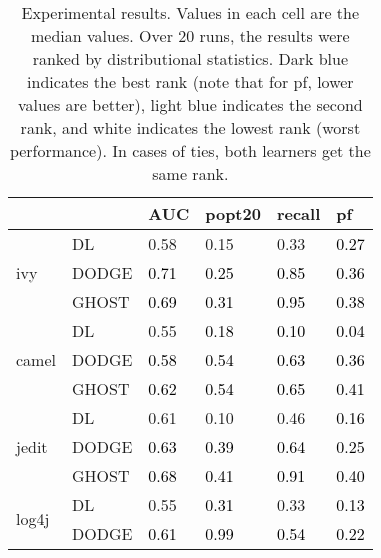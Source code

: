 \newcommand{\lightgray}[1]{\cellcolor{blue!10}\textcolor{black}{#1}}
\newcommand{\gray}[1]{\cellcolor{blue!30}\textcolor{black}{#1}}

\begin{table}[ht]
\caption{Experimental results. Values in each cell are the median values. Over 20 runs, the results were ranked by distributional statistics. \colorbox{blue!30}{Dark blue} indicates the best rank (note that for pf, lower values are better), \colorbox{blue!10}{light blue} indicates the second rank, and white indicates the lowest rank (worst performance). In cases of ties, both learners get the same rank.}
\label{tab:results}
~~~~~~~~\begin{tabular}{ll|llll}
\toprule
                                         &       & AUC  & popt20 & recall & pf   \\ \midrule
\multicolumn{1}{l}{\multirow{3}{*}{ivy}} & DL &  0.58 & 0.15 & 0.33 & \gray{0.27} \\
\multicolumn{1}{c}{}                     & DODGE & \gray{0.71} & \lightgray{0.25}   & \lightgray{0.85}   & \lightgray{0.36} \\
\multicolumn{1}{c}{}                     & GHOST & \lightgray{0.69}  & \gray{0.31}   & \gray{0.95}    & \lightgray{0.38} \\
\midrule \multirow{3}{*}{camel}          & DL & 0.55 & \lightgray{0.18} & \lightgray{0.10} & \gray{0.04} \\       
                                         & DODGE & \lightgray{0.58} & \gray{0.54}   & \gray{0.63}   & \gray{0.36} \\
                                         & GHOST & \gray{0.62} & \gray{0.54}   & \gray{0.65}   & \lightgray{0.41} \\
\midrule \multirow{3}{*}{jedit}          & DL & 0.61 & 0.10 & 0.46 & \gray{0.16} \\         
                                         & DODGE & \lightgray{0.63} & \lightgray{0.39}   & \lightgray{0.64}   & \gray{0.25} \\
                                         & GHOST & \gray{0.68} & \gray{0.41}   & \gray{0.91}   & \lightgray{0.40} \\
\midrule \multirow{3}{*}{log4j}          & DL & 0.55 & \lightgray{0.31} & 0.33 & \gray{0.13} \\        
                                         & DODGE & \lightgray{0.61} & \gray{0.99}   & \lightgray{0.54}   & \lightgray{0.22} \\

\end{tabular}
\end{table}
